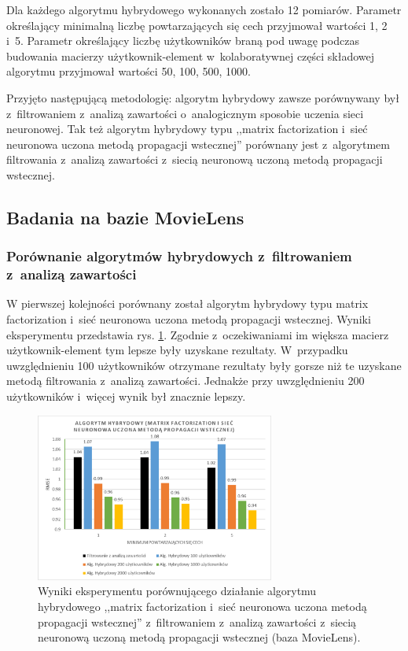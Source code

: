 \documentclass[twoside]{iisthesis}
\begin{document}
		Dla każdego algorytmu hybrydowego wykonanych zostało 12 pomiarów. Parametr określający minimalną liczbę powtarzających się cech przyjmował wartości 1, 2 i~5. Parametr określający liczbę użytkowników braną pod uwagę podczas budowania macierzy użytkownik-element w~kolaboratywnej części składowej algorytmu przyjmował wartości 50, 100, 500, 1000. 
		
		Przyjęto następującą metodologię: algorytm hybrydowy zawsze porównywany był z~filtrowaniem z~analizą zawartości o~analogicznym sposobie uczenia sieci neuronowej. Tak też algorytm hybrydowy typu ,,matrix factorization i~sieć neuronowa uczona metodą propagacji wstecznej'' porównany jest z~algorytmem filtrowania z~analizą zawartości z~siecią neuronową uczoną metodą propagacji wstecznej.
		
		\subsection{Badania na bazie MovieLens}
				
		\subsubsection{Porównanie algorytmów hybrydowych z~filtrowaniem z~analizą zawartości}
		
		W pierwszej kolejności porównany został algorytm hybrydowy typu matrix  factorization i~sieć neuronowa uczona metodą propagacji wstecznej. Wyniki eksperymentu przedstawia rys. \ref{fig:ml_exphybrid1_1}. Zgodnie z~oczekiwaniami im większa macierz użytkownik-element tym lepsze były uzyskane rezultaty. W~przypadku uwzględnieniu 100 użytkowników otrzymane rezultaty były gorsze niż te uzyskane metodą filtrowania z~analizą zawartości. Jednakże przy uwzględnieniu 200 użytkowników i~więcej wynik był znacznie lepszy. 
		
		\begin{figure}[!ht]
			\centering
			\includegraphics[width=0.7\textwidth]{ml_exphybrid1_1}			
			\caption{Wyniki eksperymentu porównującego działanie algorytmu hybrydowego ,,matrix factorization i~sieć neuronowa uczona metodą propagacji wstecznej'' z~filtrowaniem z~analizą zawartości z~siecią neuronową uczoną metodą propagacji wstecznej (baza MovieLens).}
			\label{fig:ml_exphybrid1_1}
		\end{figure}
	
\end{document}
